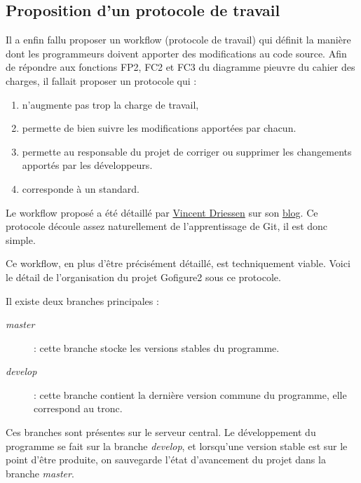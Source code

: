 \subsection{Proposition d'un protocole de travail}
Il a enfin fallu proposer un workflow (protocole de travail) 
qui définit la manière dont les programmeurs
doivent apporter des modifications au code source.
Afin de répondre aux fonctions FP2, FC2 et FC3 du diagramme pieuvre du cahier des charges, il fallait proposer un protocole qui :
\begin{enumerate}
  \item n'augmente pas trop la charge de travail,
  \item permette de bien suivre les modifications apportées par chacun. 
  \item permette au responsable du projet de corriger ou supprimer les changements apportés par les développeurs.
  \item corresponde à un standard.
\end{enumerate}

Le workflow proposé a été détaillé par \href{http://nvie.com/about }{Vincent Driessen} sur son \href{http://nvie.com/Git-model}{blog}.
Ce protocole découle assez naturellement de l'apprentissage de Git, il est donc simple.


Ce workflow, en plus d'être précisément détaillé, est techniquement viable. 
Voici le détail de l'organisation du projet Gofigure2 sous ce protocole.

Il existe deux branches principales : 
\begin{description}
  \item[\emph{master}] : cette branche stocke les versions stables du programme.
  \item[\emph{develop}] : cette branche contient la dernière version commune du programme, elle correspond au tronc.
\end{description}
Ces branches sont présentes sur le serveur central. Le développement du programme se fait sur la branche \emph{develop}, et lorsqu'une version stable est sur le point d'être produite, on sauvegarde l'état d'avancement du projet dans la branche \emph{master}.

